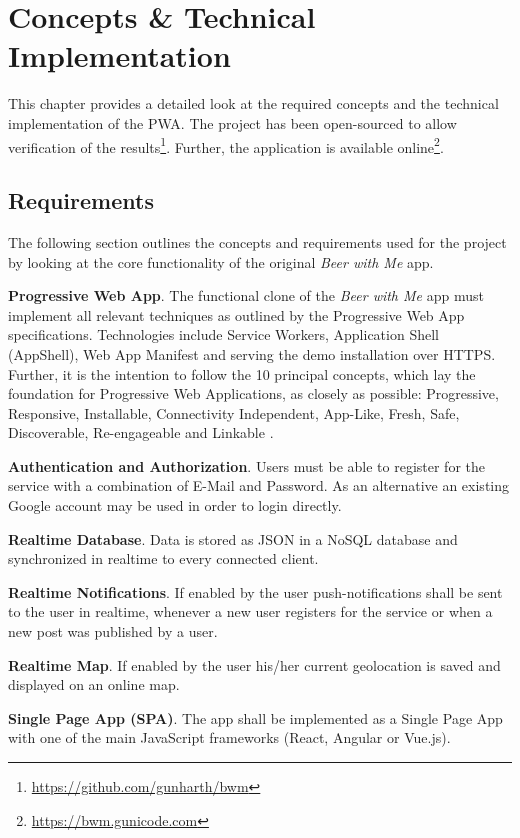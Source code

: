 \chapter{Concepts \& Technical Implementation}
This chapter provides a detailed look at the required concepts and the technical implementation of the PWA. The project has been open-sourced to allow verification of the results\footnote{\url{https://github.com/gunharth/bwm}}. Further, the application is available online\footnote{\url{https://bwm.gunicode.com}}.

\section{Requirements}

The following section outlines the concepts and requirements used for the project by looking at the core functionality of the original \textit{Beer with Me} app.

\textbf{Progressive Web App}. The functional clone of the \textit{Beer with Me} app must implement all relevant techniques as outlined by the Progressive Web App specifications. Technologies include Service Workers, Application Shell (AppShell), Web App Manifest and serving the demo installation over HTTPS. Further, it is the intention to follow the 10 principal concepts, which lay the foundation for Progressive Web Applications, as closely as possible: Progressive, Responsive, Installable, Connectivity Independent, App-Like, Fresh, Safe, Discoverable, Re-engageable and Linkable \citep{osmaniGettingStartedProgressive2015}.

\textbf{Authentication and Authorization}. Users must be able to register for the service with a combination of E-Mail and Password. As an alternative an existing Google account may be used in order to login directly.

\textbf{Realtime Database}. Data is stored as JSON in a NoSQL database and synchronized in realtime to every connected client.

\textbf{Realtime Notifications}. If enabled by the user push-notifications shall be sent to the user in realtime, whenever a new user registers for the service or when a new post was published by a user.

\textbf{Realtime Map}. If enabled by the user his/her current geolocation is saved and displayed on an online map.

\textbf{Single Page App (SPA)}. The app shall be implemented as a Single Page App with one of the main JavaScript frameworks (React, Angular or Vue.js).

